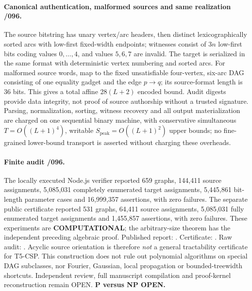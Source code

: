 \documentclass[11pt]{article}
\begin{document}
\paragraph{Canonical authentication, malformed sources and same realization /096.}
The source bitstring has unary vertex/arc headers, then distinct
lexicographically sorted arcs with low-first fixed-width endpoints;
witnesses consist of $3n$ low-first bits coding values $0,\ldots,4$,
and values $5,6,7$ are invalid. The target is serialized in the
same format with deterministic vertex numbering and sorted arcs.
For malformed source words, map to the fixed unsatisfiable
four-vertex, six-arc DAG consisting of one equality gadget and
the edge $p\to q$; its source-format length is $36$ bits.
This gives a total affine $28(L+2)$ encoded bound.
Audit digests provide data integrity, not proof of source
authorship without a trusted signature.  Parsing, normalization,
sorting, witness recovery and all output materialization are
charged on one sequential binary machine, with conservative
simultaneous $T=O((L+1)^4)$, writable
$S_{\mathrm{peak}}=O((L+1)^2)$ upper bounds; no
fine-grained lower-bound transport is asserted without
charging these overheads.
\paragraph{Finite audit /096.}
The locally executed Node.js verifier reported 659 graphs,
144,411 source assignments, 5,085,031 completely enumerated
target assignments, 5,445,861 bit-length parameter cases and
16,999,357 assertions, with zero failures. The separate public
certificate reported 531 graphs, 64,411 source assignments,
5,085,031 fully enumerated target assignments and
1,455,857 assertions, with zero failures.
These experiments are \textbf{COMPUTATIONAL}; the arbitrary-size
theorem has the independent preceding algebraic proof.
Published report:
.
Certificate:
.
Raw audit:
.
Acyclic source orientation is therefore \emph{not} a general
tractability certificate for T5-CSP.  This construction does not
rule out polynomial algorithms on special DAG subclasses, nor
Fourier, Gaussian, local propagation or bounded-treewidth shortcuts.
Independent review, full manuscript compilation and proof-kernel
reconstruction remain OPEN. \textbf{P versus NP OPEN.}
\end{document}
